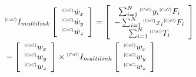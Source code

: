 \documentclass{jarticle}
\begin{document}
\begin{eqnarray}
  \label{eq:model2-0}
  & {}^{\scalebox{.5}{$\{CoG\}$}}I_{multilink} \left[ \begin{array}{c}
      {}^{\scalebox{.5}{$\{CoG\}$}}\dot{w} _x \\
      {}^{\scalebox{.5}{$\{CoG\}$}}\dot{w} _y \\
      {}^{\scalebox{.5}{$\{CoG\}$}}\dot{w} _z
    \end{array}\right]
  = \left[ \begin{array}{c}
      \sum_{i=1}^{N} {}^{\scalebox{.5}{$\{CoG\}$}}y_i {}^{\scalebox{.5}{$\{CoG\}$}}F_i \\
      -\sum_{i=1}^{N} {}^{\scalebox{.5}{$\{CoG\}$}}x_i {}^{\scalebox{.5}{$\{CoG\}$}}F_i \\
      \sum_{i=1}^{N} {}^{\scalebox{.5}{$\{CoG\}$}}T_i
    \end{array}\right] \nonumber \\
  \label{eq:model2}
  & - \left[ \begin{array}{c}
      {}^{\scalebox{.5}{$\{CoG\}$}}w_x \\
      {}^{\scalebox{.5}{$\{CoG\}$}}w_y \\
      {}^{\scalebox{.5}{$\{CoG\}$}}w_z
    \end{array}\right]
  \times {}^{\scalebox{.5}{$\{CoG\}$}}I_{multilink} \left[ \begin{array}{c}
      {}^{\scalebox{.5}{$\{CoG\}$}}w_x \\
      {}^{\scalebox{.5}{$\{CoG\}$}}w_y \\
      {}^{\scalebox{.5}{$\{CoG\}$}}w_z
    \end{array}\right]
\end{eqnarray}

  
\end{document}
